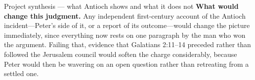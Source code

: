 \begin{studybox}{Project synthesis --- what Antioch shows and what it does not}
\textbf{What would change this judgment.} Any independent first-century
account of the Antioch incident---Peter's side of it, or a report of its
outcome---would change the picture immediately, since everything now rests on
one paragraph by the man who won the argument. Failing that, evidence that
Galatians 2:11--14 preceded rather than followed the Jerusalem council would
soften the charge considerably, because Peter would then be wavering on an
open question rather than retreating from a settled one.
\end{studybox}
